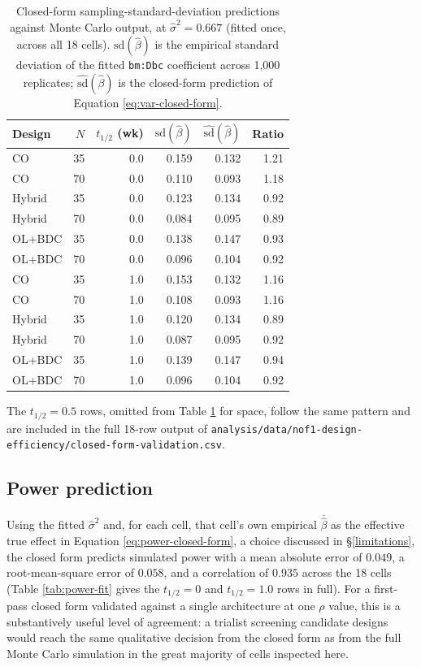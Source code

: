 \documentclass[
  11pt,
]{article}
\begin{document}
\begin{table}[H]
\centering
\caption{Closed-form sampling-standard-deviation predictions against Monte Carlo output, at $\hat\sigma^2 = 0.667$ (fitted once, across all 18 cells). $\mathrm{sd}(\hat\beta)$ is the empirical standard deviation of the fitted \texttt{bm:Dbc} coefficient across 1{,}000 replicates; $\widehat{\mathrm{sd}}(\hat\beta)$ is the closed-form prediction of Equation \ref{eq:var-closed-form}.}
\label{tab:variance-fit}

\begin{tabular}{lrrrrr}
\toprule
Design & $N$ & $t_{1/2}$ (wk) & $\mathrm{sd}(\hat\beta)$ & $\widehat{\mathrm{sd}}(\hat\beta)$ & Ratio\\
\midrule
CO & 35 & 0.0 & 0.159 & 0.132 & 1.21\\
CO & 70 & 0.0 & 0.110 & 0.093 & 1.18\\
Hybrid & 35 & 0.0 & 0.123 & 0.134 & 0.92\\
Hybrid & 70 & 0.0 & 0.084 & 0.095 & 0.89\\
OL+BDC & 35 & 0.0 & 0.138 & 0.147 & 0.93\\
OL+BDC & 70 & 0.0 & 0.096 & 0.104 & 0.92\\
CO & 35 & 1.0 & 0.153 & 0.132 & 1.16\\
CO & 70 & 1.0 & 0.108 & 0.093 & 1.16\\
Hybrid & 35 & 1.0 & 0.120 & 0.134 & 0.89\\
Hybrid & 70 & 1.0 & 0.087 & 0.095 & 0.92\\
OL+BDC & 35 & 1.0 & 0.139 & 0.147 & 0.94\\
OL+BDC & 70 & 1.0 & 0.096 & 0.104 & 0.92\\
\bottomrule
\end{tabular}
\end{table}

The \(t_{1/2}=0.5\) rows, omitted from Table \ref{tab:variance-fit}
for space, follow the same pattern and are included in the full
18-row output of
\texttt{analysis/data/nof1-design-efficiency/closed-form-validation.csv}.

\subsection{Power prediction}\label{power-prediction}

Using the fitted \(\hat\sigma^2\) and, for each cell, that cell's own
empirical \(\overline{\hat\beta}\) as the effective true effect in
Equation \eqref{eq:power-closed-form}, a choice discussed in
\S\ref{limitations}, the closed form predicts simulated power with
a mean absolute error of \(0.049\), a root-mean-square
error of \(0.058\), and a correlation of
\(0.935\) across the 18 cells (Table
\ref{tab:power-fit} gives the \(t_{1/2}=0\) and \(t_{1/2}=1.0\) rows in
full). For a first-pass closed form validated against a single
architecture at one \(\rho\) value, this is a substantively useful
level of agreement: a trialist screening candidate designs would
reach the same qualitative decision from the closed form as from the
full Monte Carlo simulation in the great majority of cells inspected
here.
\end{document}
